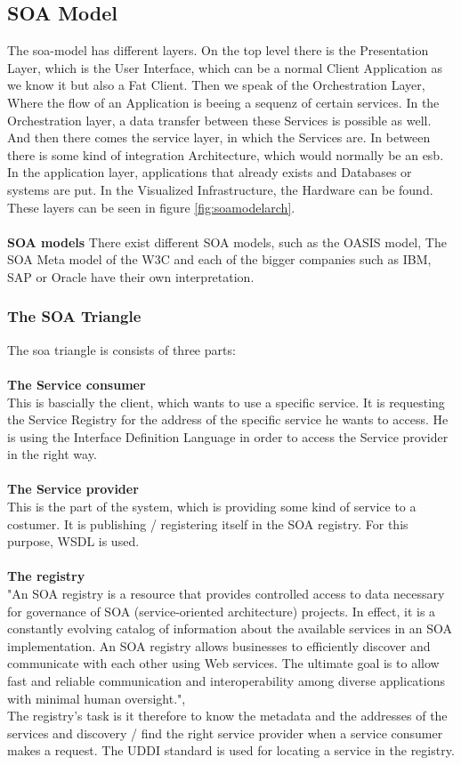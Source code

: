 \documentclass[12pt]{article}
\begin{document}
\subsection{SOA Model}
The \gls{soa}-model has different layers. On the top level there is the Presentation Layer, which is the User Interface, which can be a normal Client Application as we know it but also a Fat Client. Then we speak of the Orchestration Layer, Where the flow of an Application is beeing a sequenz of certain services. In the Orchestration layer, a data transfer between these Services is possible as well. And then there comes the service layer, in which the Services are. In between there is some kind of integration Architecture, which would normally be an \gls{esb}. In the application layer, applications that already exists and Databases or systems are put. In the Visualized Infrastructure, the Hardware can be found. These layers can be seen in figure \ref{fig:soamodelarch}.\\
\\\textbf{SOA models}
There exist different SOA models, such as the OASIS model, The SOA Meta model of the W3C and each of the bigger companies such as IBM, SAP or Oracle have their own interpretation.
\subsubsection{The SOA Triangle}
\label{sec:soatriangle}
The \gls{soa} triangle is consists of three parts:
\\\\\textbf{The Service consumer} \\
This is bascially the client, which wants to use a specific service. It is requesting the Service Registry 	for the address of the specific service he wants to access. He is using the Interface Definition Language in order to  access the Service provider in the right way.
\\\\\textbf{The Service provider}\\ 
This is the part of the system, which is providing some kind of service to a costumer. It is publishing / registering itself in the SOA registry. For this purpose, WSDL is used.
\\\\\textbf{The registry}\\ 
"An SOA registry is a resource that provides controlled access to data necessary for governance of SOA (service-oriented architecture) projects. In effect, it is a constantly evolving catalog of information about the available services in an SOA implementation. An SOA registry allows businesses to efficiently discover and communicate with each other using Web services. The ultimate goal is to allow fast and reliable communication and interoperability among diverse applications with minimal human oversight.", \cite{soareg}\\
The registry's task is it therefore to know the metadata and the addresses of the services and discovery / find the right service provider when a service consumer makes a request.
The UDDI standard is used for locating a service in the registry.
\end{document}
